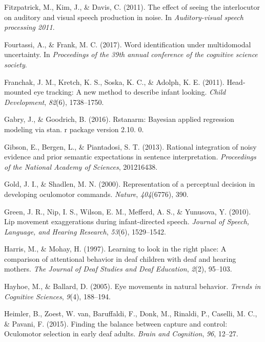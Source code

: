 \documentclass[,man,floatsintext]{apa6}
\begin{document}
\hypertarget{ref-fitzpatrick2011effect}{}
Fitzpatrick, M., Kim, J., \& Davis, C. (2011). The effect of seeing the
interlocutor on auditory and visual speech production in noise. In
\emph{Auditory-visual speech processing 2011}.

\hypertarget{ref-fourtassiword2018}{}
Fourtassi, A., \& Frank, M. C. (2017). Word identification under
multidomodal uncertainty. In \emph{Proceedings of the 39th annual
conference of the cognitive science society}.

\hypertarget{ref-franchak2011head}{}
Franchak, J. M., Kretch, K. S., Soska, K. C., \& Adolph, K. E. (2011).
Head-mounted eye tracking: A new method to describe infant looking.
\emph{Child Development}, \emph{82}(6), 1738--1750.

\hypertarget{ref-gabry2016rstanarm}{}
Gabry, J., \& Goodrich, B. (2016). Rstanarm: Bayesian applied regression
modeling via stan. r package version 2.10. 0.

\hypertarget{ref-gibson2013rational}{}
Gibson, E., Bergen, L., \& Piantadosi, S. T. (2013). Rational
integration of noisy evidence and prior semantic expectations in
sentence interpretation. \emph{Proceedings of the National Academy of
Sciences}, 201216438.

\hypertarget{ref-gold2000representation}{}
Gold, J. I., \& Shadlen, M. N. (2000). Representation of a perceptual
decision in developing oculomotor commands. \emph{Nature},
\emph{404}(6776), 390.

\hypertarget{ref-green2010lip}{}
Green, J. R., Nip, I. S., Wilson, E. M., Mefferd, A. S., \& Yunusova, Y.
(2010). Lip movement exaggerations during infant-directed speech.
\emph{Journal of Speech, Language, and Hearing Research}, \emph{53}(6),
1529--1542.

\hypertarget{ref-harris1997learning}{}
Harris, M., \& Mohay, H. (1997). Learning to look in the right place: A
comparison of attentional behavior in deaf children with deaf and
hearing mothers. \emph{The Journal of Deaf Studies and Deaf Education},
\emph{2}(2), 95--103.

\hypertarget{ref-hayhoe2005eye}{}
Hayhoe, M., \& Ballard, D. (2005). Eye movements in natural behavior.
\emph{Trends in Cognitive Sciences}, \emph{9}(4), 188--194.

\hypertarget{ref-heimler2015finding}{}
Heimler, B., Zoest, W. van, Baruffaldi, F., Donk, M., Rinaldi, P.,
Caselli, M. C., \& Pavani, F. (2015). Finding the balance between
capture and control: Oculomotor selection in early deaf adults.
\emph{Brain and Cognition}, \emph{96}, 12--27.
\end{document}
